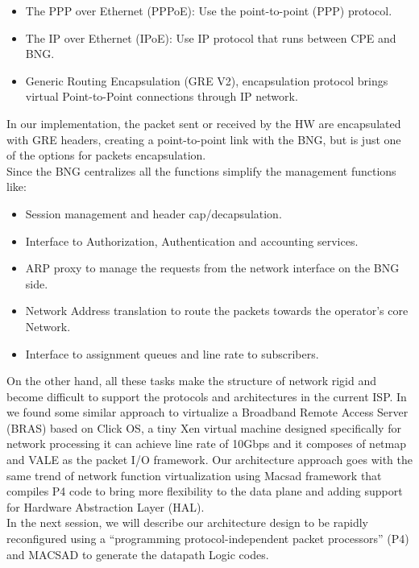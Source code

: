 \begin{itemize}
\item The PPP over Ethernet (PPPoE): Use the point-to-point (PPP) protocol.
\item The IP over Ethernet (IPoE): Use IP protocol that runs between CPE and BNG.
\item Generic Routing Encapsulation (GRE V2), encapsulation protocol brings virtual  Point-to-Point connections through IP network.
\end{itemize}
In our implementation, the packet sent or received by the HW are encapsulated with GRE headers, creating a point-to-point link with the BNG, but is just one of the options for packets encapsulation. \\
Since the BNG centralizes all the functions simplify the management functions like:
\begin{itemize}
\item Session management and header cap/decapsulation.
\item Interface to Authorization, Authentication and accounting services.
\item ARP proxy to manage the requests from the network interface on the BNG side.
\item Network Address translation to route the packets towards the operator’s core Network.
\item Interface to assignment queues and line rate to subscribers.
\end{itemize}
On the other hand, all these tasks make the structure of network rigid and become difficult to support the protocols and architectures in the current ISP.  In \cite{Rethinking} we found some similar approach to virtualize a Broadband Remote Access Server (BRAS) based on Click OS, a tiny Xen virtual machine designed specifically for network processing it can achieve line rate of 10Gbps and it composes of netmap and VALE as the packet I/O framework.
Our architecture approach goes with the same trend of network function virtualization using Macsad framework that compiles P4 code to bring more flexibility to the data plane and adding support for Hardware Abstraction Layer (HAL).\\
In the next session, we will describe our architecture design to be rapidly reconfigured using a “programming protocol-independent packet processors” (P4) and MACSAD to generate the datapath Logic codes.


